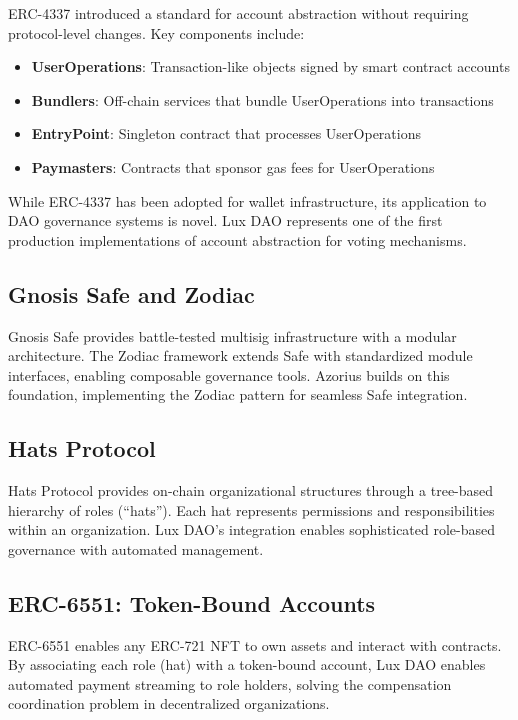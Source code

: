 \documentclass[11pt,a4paper]{article}
\begin{document}
ERC-4337 \cite{erc4337} introduced a standard for account abstraction without requiring protocol-level changes. Key components include:

\begin{itemize}
    \item \textbf{UserOperations}: Transaction-like objects signed by smart contract accounts
    \item \textbf{Bundlers}: Off-chain services that bundle UserOperations into transactions
    \item \textbf{EntryPoint}: Singleton contract that processes UserOperations
    \item \textbf{Paymasters}: Contracts that sponsor gas fees for UserOperations
\end{itemize}

While ERC-4337 has been adopted for wallet infrastructure, its application to DAO governance systems is novel. Lux DAO represents one of the first production implementations of account abstraction for voting mechanisms.

\subsection{Gnosis Safe and Zodiac}

Gnosis Safe \cite{safe} provides battle-tested multisig infrastructure with a modular architecture. The Zodiac framework \cite{zodiac} extends Safe with standardized module interfaces, enabling composable governance tools. Azorius builds on this foundation, implementing the Zodiac pattern for seamless Safe integration.

\subsection{Hats Protocol}

Hats Protocol \cite{hats} provides on-chain organizational structures through a tree-based hierarchy of roles (``hats''). Each hat represents permissions and responsibilities within an organization. Lux DAO's integration enables sophisticated role-based governance with automated management.

\subsection{ERC-6551: Token-Bound Accounts}

ERC-6551 \cite{erc6551} enables any ERC-721 NFT to own assets and interact with contracts. By associating each role (hat) with a token-bound account, Lux DAO enables automated payment streaming to role holders, solving the compensation coordination problem in decentralized organizations.
\end{document}

